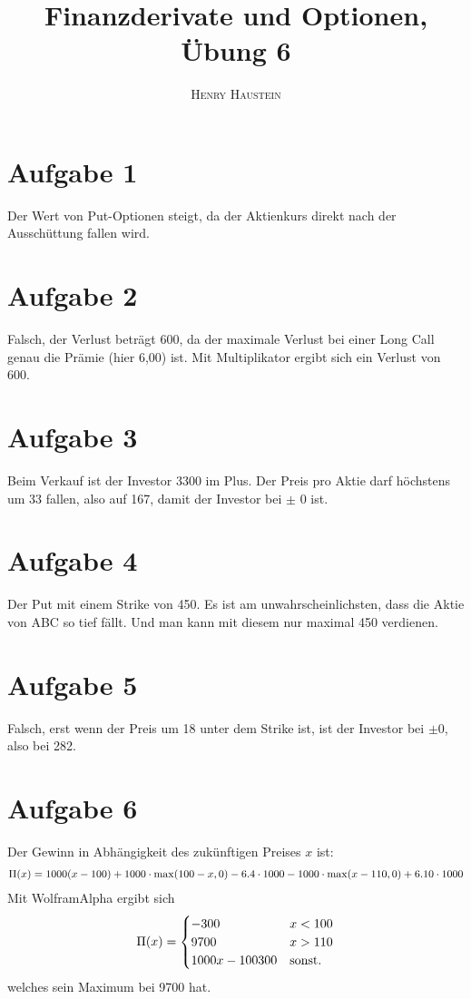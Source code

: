 \documentclass{article}
\title{\textbf{Finanzderivate und Optionen, Übung 6}}
\author{\textsc{Henry Haustein}}
\date{}
\begin{document}
	\maketitle
	
	\section*{Aufgabe 1}
	Der Wert von Put-Optionen steigt, da der Aktienkurs direkt nach der Ausschüttung fallen wird.

	\section*{Aufgabe 2}
	Falsch, der Verlust beträgt 600, da der maximale Verlust bei einer Long Call genau die Prämie (hier 6,00) ist. Mit Multiplikator ergibt sich ein Verlust von 600.
	
	\section*{Aufgabe 3}
	Beim Verkauf ist der Investor 3300 im Plus. Der Preis pro Aktie darf höchstens um 33 fallen, also auf 167, damit der Investor bei $\pm$ 0 ist.
	
	\section*{Aufgabe 4}
	Der Put mit einem Strike von 450. Es ist am unwahrscheinlichsten, dass die Aktie von ABC so tief fällt. Und man kann mit diesem nur maximal 450 verdienen.
	
	\section*{Aufgabe 5}
	Falsch, erst wenn der Preis um 18 unter dem Strike ist, ist der Investor bei $\pm 0$, also bei 282.
	
	\section*{Aufgabe 6}
	Der Gewinn in Abhängigkeit des zukünftigen Preises $x$ ist:
	\begin{align}
		\Pi(x) = 1000(x-100) + 1000\cdot \max(100 - x, 0) - 6.4\cdot 1000 - 1000\cdot\max(x-110,0) + 6.10\cdot 1000 \notag
	\end{align}
	Mit WolframAlpha ergibt sich
	\begin{align}
		\Pi(x) = \begin{cases}
			-300 & x<100 \\
			9700 & x>110 \\
			1000x - 100300 & \text{sonst.}
		\end{cases} \notag
	\end{align}
	welches sein Maximum bei 9700 hat.
	
\end{document}
